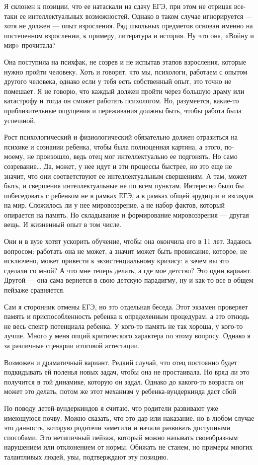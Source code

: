 Я склонен к позиции, что ее натаскали на сдачу ЕГЭ, при этом не отрицая все-таки ее интеллектуальных возможностей. Однако в таком случае игнорируется --- хотя не должен --- опыт взросления. Ряд школьных предметов основан именно на постепенном взрослении, к примеру, литература и история. Ну что она, «Войну и мир» прочитала?

Она поступила на психфак, не созрев и не испытав этапов взросления, которые нужно пройти человеку. Хоть и говорят, что мы, психологи, работаем с опытом другого человека, однако если у тебя есть собственный опыт, это точно не помешает. Я не говорю, что каждый должен пройти через большую драму или катастрофу и тогда он сможет работать психологом. Но, разумеется, какие-то приблизительные ощущения и переживания должны быть, чтобы работа была успешной.

Рост психологический и физиологический обязательно должен отразиться на психике и сознании ребенка, чтобы была полноценная картина, а этого, по-моему, не произошло, ведь отец мог интеллектуально ее подгонять. Но само созревание… Да, может, у нее идут и эти процессы быстрее, но это еще не значит, что они соответствуют ее интеллектуальным свершениям. А там, может быть, и свершения интеллектуальные не по всем пунктам. Интересно было бы побеседовать с ребенком не в рамках ЕГЭ, а в рамках общей эрудиции и взглядов на мир. Сложилось ли у нее мировоззрение, а не набор фактов, который опирается на память. Но складывание и формирование мировоззрения --- другая вещь. И жизненный опыт в том числе.

Они и в вузе хотят ускорить обучение, чтобы она окончила его в 11 лет. Задаюсь вопросом: работать она не может, а значит может быть провисание, которое, не исключено, может привести к экзистенциальному кризису: а зачем вы это сделали со мной? А что мне теперь делать, а где мое детство? Это один вариант. Другой --- она сама вернется в свою детскую парадигму, ну и как-то все в общем пейзаже сравняется.

Сам я сторонник отмены ЕГЭ, но это отдельная беседа. Этот экзамен проверяет память и приспособленность ребенка к определенным процедурам, а это отнюдь не весь спектр потенциала ребенка. У кого-то память не так хороша, у кого-то лучше. Много у меня опций критического характера по этому вопросу. Однако я за различные сценарии итоговой аттестации.

\begin{fancyquotes}
    Возможен и драматичный вариант. Редкий случай, что отец постоянно будет подкидывать ей поленья новых задач, чтобы она не простаивала. Но вряд ли это получится в той динамике, которую он задал. Однако до какого-то возраста он может это делать, потом же этот механизм у ребенка-вундеркинда даст сбой
\end{fancyquotes}

По поводу детей-вундеркиндов я считаю, что родители развивают уже имеющуюся почву. Можно сказать, что это дар или наказание, но в любом случае это данность, которую родители заметили и начали развивать доступными способами. Это нетипичный пейзаж, который можно называть своеобразным нарушением или отклонением от нормы. Обижать не станем, но примеры многих талантливых людей, увы, подтверждают эту позицию.

